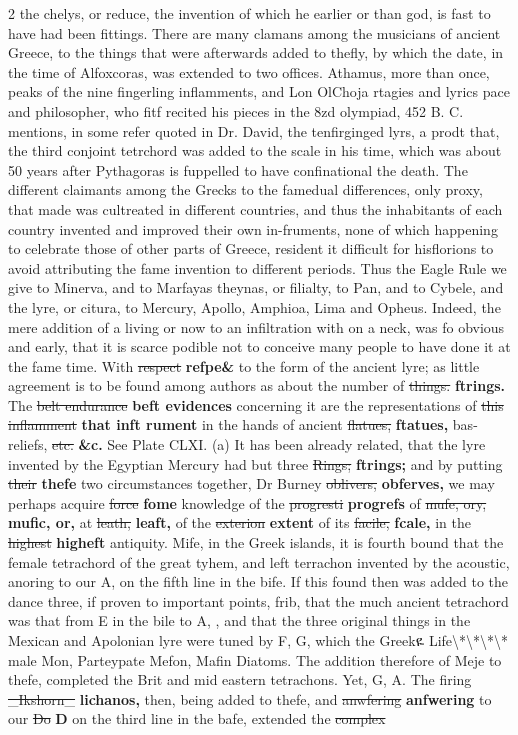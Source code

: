 \documentclass[10pt]{article}
\begin{document}
\begin{multicols}{2}
the chelys, or reduce, the invention of which he earlier or than god, is fast to have had been fittings. There are many clamans among the musicians of ancient Greece, to the things that were afterwards added to thefly, by which the date, in the time of Alfoxcoras, was extended to two offices. Athamus, more than once, peaks of the nine fingerling inflamments, and Lon OlChoja rtagies and lyrics pace and philosopher, who fitf recited his pieces in the 8zd olympiad, 452 B. C. mentions, in some refer quoted in Dr. David, the tenfirginged lyrs, a prodt that, the third conjoint tetrchord was added to the scale in his time, which was about 50 years after Pythagoras is fuppelled to have confinational the death. The different claimants among the Grecks to the famedual differences, only proxy, that made was cultreated in different countries, and thus the inhabitants of each country invented and improved their own in-fruments, none of which happening to celebrate those of other parts of Greece, resident it difficult for hisflorions to avoid attributing the fame invention to different periods. Thus the Eagle Rule we give to Minerva, and to Marfayas theynas, or filialty, to Pan, and to Cybele, and the lyre, or citura, to Mercury, Apollo, Amphioa, Lima and Opheus. Indeed, the mere addition of a living or now to an infiltration with on a neck, was fo obvious and early, that it is scarce podible not to conceive many people to have done it at the fame time. With \sout{respect} \textbf{refpe\&} to the form of the ancient lyre; as little agreement is to be found among authors as about the number of \sout{things.} \textbf{ftrings.} The \sout{belt endurance} \textbf{beft evidences} concerning it are the representations of \sout{this inflamment} \textbf{that inft rument} in the hands of ancient \sout{flatues,} \textbf{ftatues,} bas-reliefs, \sout{etc.} \textbf{\&c.} See Plate CLXI. (a) It has been already related, that the lyre invented by the Egyptian Mercury had but three \sout{Rings;} \textbf{ftrings;} and by putting \sout{their} \textbf{thefe} two circumstances together, Dr Burney \sout{oblivers,} \textbf{obferves,} we may perhaps acquire \sout{force} \textbf{fome} knowledge of the \sout{progresti} \textbf{progrefs} of \sout{mufe, ory,} \textbf{mufic, or,} at \sout{leath,} \textbf{leaft,} of the \sout{exterion} \textbf{extent} of its \sout{facile,} \textbf{fcale,} in the \sout{highest} \textbf{higheft} antiquity. Mife, in the Greek islands, it is fourth bound that the female tetrachord of the great tyhem, and left terrachon invented by the acoustic, anoring to our A, on the fifth line in the bife. If this found then was added to the dance three, if proven to important points, frib, that the much ancient tetrachord was that from E in the bile to A, , and that the three original things in the Mexican and Apolonian lyre were tuned by F, G, which the Greekዬ Life\textbackslash{}*\textbackslash{}*\textbackslash{}*\textbackslash{}* male Mon, Parteypate Mefon, Mafin Diatoms. The addition therefore of Meje to thefe, completed the Brit and mid eastern tetrachons. Yet, G, A. The firing \sout{\_Ikshorn\_} \textbf{lichanos,} then, being added to thefe, and \sout{anwfering} \textbf{anfwering} to our \sout{Do} \textbf{D} on the third line in the bafe, extended the \sout{complex} 
\end{multicols}
\end{document}
